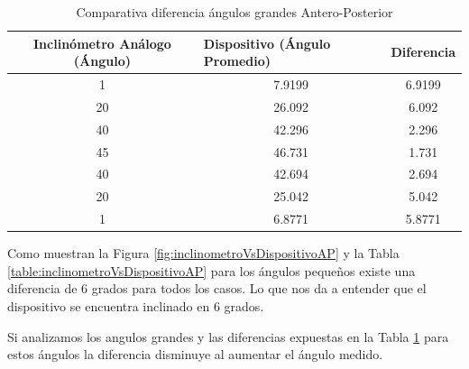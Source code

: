 \documentclass[12pt,a4paper]{article}
\begin{document}
\begin{table}[H]
	\centering
	\begin{tabular}{|c|c|c|}
		\hline
		\textbf{Inclinómetro Análogo (Ángulo)} & \multicolumn{1}{l|}{\textbf{Dispositivo (Ángulo Promedio)}} & Diferencia 				\\ \hline
		1                                      & 7.9199                                                      & 6.9199                     \\ \hline
		20                                      & 26.092                                                      & 6.092                    \\ \hline
		40                                      & 42.296                                                      & 2.296                     \\ \hline
		45                                      & 46.731                                                      & 1.731                     \\ \hline
		40                                      & 42.694                                                      & 2.694                      \\ \hline
		20                                      & 25.042                                                      & 5.042                     \\ \hline
		1                                      & 6.8771                                                      & 5.8771                     \\ \hline
	\end{tabular}
	\caption{Comparativa diferencia ángulos grandes Antero-Posterior}
	\label{table:inclinometroVsDispositivoAPD}
\end{table}

Como muestran la Figura \ref{fig:inclinometroVsDispositivoAP} y la Tabla \ref{table:inclinometroVsDispositivoAP} para los ángulos pequeños existe una diferencia de 6 grados para todos los casos.
Lo que nos da a entender que el dispositivo se encuentra inclinado en 6 grados.

Si analizamos los angulos grandes y las diferencias expuestas en la Tabla \ref{table:inclinometroVsDispositivoAPD} para estos ángulos la diferencia disminuye al aumentar el ángulo medido.
\end{document}
